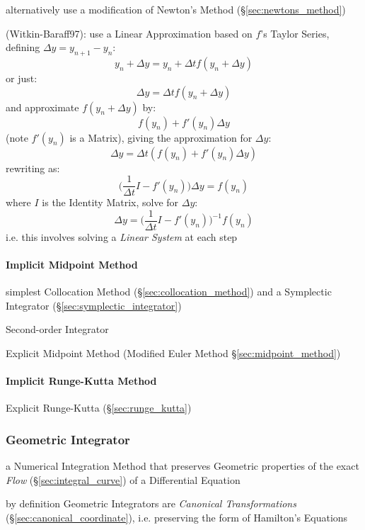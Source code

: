 alternatively use a modification of Newton's Method (\S\ref{sec:newtons_method})

(Witkin-Baraff97): use a Linear Approximation based on $f$'s Taylor Series,
defining $\Delta{y} = y_{n+1} - y_n$:
\[
  y_n + \Delta{y} = y_n + \Delta{t}f(y_n + \Delta{y})
\]
or just:
\[
  \Delta{y} = \Delta{t}f(y_n + \Delta{y})
\]
and approximate $f(y_n + \Delta{y})$ by:
\[
  f(y_n) + f'(y_n)\Delta{y}
\]
(note $f'(y_n)$ is a Matrix), giving the approximation for $\Delta{y}$:
\[
  \Delta{y} = \Delta{t}(f(y_n) + f'(y_n)\Delta{y})
\]
rewriting as:
\[
  \Big(\frac{1}{\Delta{t}}I - f'(y_n)\Big)\Delta{y} = f(y_n)
\]
where $I$ is the Identity Matrix, solve for $\Delta{y}$:
\[
  \Delta{y} = \Big(\frac{1}{\Delta{t}}I - f'(y_n)\Big)^{-1}f(y_n)
\]
i.e. this involves solving a \emph{Linear System} at each step



\paragraph{Implicit Midpoint Method}\label{sec:implicit_midpoint}\hfill

simplest Collocation Method (\S\ref{sec:collocation_method}) and
a Symplectic Integrator (\S\ref{sec:symplectic_integrator})

Second-order Integrator

\fist Explicit Midpoint Method (Modified Euler Method
\S\ref{sec:midpoint_method})



\paragraph{Implicit Runge-Kutta Method}\label{sec:implicit_runge_kutta}\hfill

\fist Explicit Runge-Kutta (\S\ref{sec:runge_kutta})



\subsubsection{Geometric Integrator}\label{sec:geometric_integrator}

a Numerical Integration Method that preserves Geometric properties of the exact
\emph{Flow} (\S\ref{sec:integral_curve}) of a Differential Equation

by definition Geometric Integrators are \emph{Canonical Transformations}
(\S\ref{sec:canonical_coordinate}), i.e. preserving the form of Hamilton's
Equations



